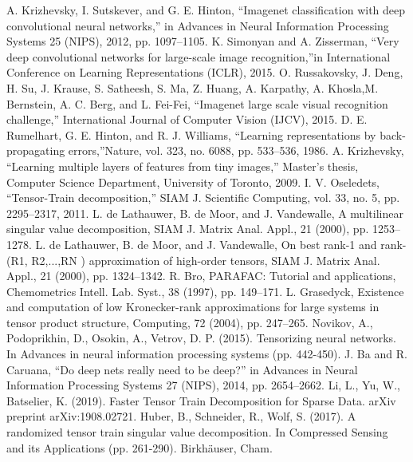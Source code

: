 \documentclass[onecolumn, conference]{IEEEtran}
\begin{document}

\begin{thebibliography}{00}
 A. Krizhevsky, I. Sutskever, and G. E. Hinton, ``Imagenet classification with deep convolutional neural networks,'' in Advances in Neural Information Processing Systems 25 (NIPS), 2012, pp. 1097–1105. 
 K. Simonyan and A. Zisserman, “Very deep convolutional networks for large-scale image recognition,”in International Conference on Learning Representations (ICLR), 2015.
 O. Russakovsky, J. Deng, H. Su, J. Krause, S. Satheesh, S. Ma, Z. Huang, A. Karpathy, A. Khosla,M. Bernstein, A. C. Berg, and L. Fei-Fei, “Imagenet large scale visual recognition challenge,” International Journal of Computer Vision (IJCV), 2015.
 D. E. Rumelhart, G. E. Hinton, and R. J. Williams, “Learning representations by back-propagating errors,”Nature, vol. 323, no. 6088, pp. 533–536, 1986.
 A. Krizhevsky, “Learning multiple layers of features from tiny images,” Master’s thesis, Computer Science Department, University of Toronto, 2009.
 I. V. Oseledets, “Tensor-Train decomposition,” SIAM J. Scientific Computing, vol. 33, no. 5, pp. 2295–2317, 2011.
 L. de Lathauwer, B. de Moor, and J. Vandewalle, A multilinear singular value decomposition, SIAM J. Matrix Anal. Appl., 21 (2000), pp. 1253–1278.
 L. de Lathauwer, B. de Moor, and J. Vandewalle, On best rank-1 and rank-(R1, R2,...,RN ) approximation of high-order tensors, SIAM J. Matrix Anal. Appl., 21 (2000), pp. 1324–1342.
 R. Bro, PARAFAC: Tutorial and applications, Chemometrics Intell. Lab. Syst., 38 (1997), pp. 149–171.
 L. Grasedyck, Existence and computation of low Kronecker-rank approximations for large systems in tensor product structure, Computing, 72 (2004), pp. 247–265.
 Novikov, A., Podoprikhin, D., Osokin, A., Vetrov, D. P. (2015). Tensorizing neural networks. In Advances in neural information processing systems (pp. 442-450).
 J. Ba and R. Caruana, “Do deep nets really need to be deep?” in Advances in Neural Information Processing Systems 27 (NIPS), 2014, pp. 2654–2662.
 Li, L., Yu, W., Batselier, K. (2019). Faster Tensor Train Decomposition for Sparse Data. arXiv preprint arXiv:1908.02721.
 Huber, B., Schneider, R., Wolf, S. (2017). A randomized tensor train singular value decomposition. In Compressed Sensing and its Applications (pp. 261-290). Birkhäuser, Cham.
\end{thebibliography}
\vspace{12pt}
\end{document}
